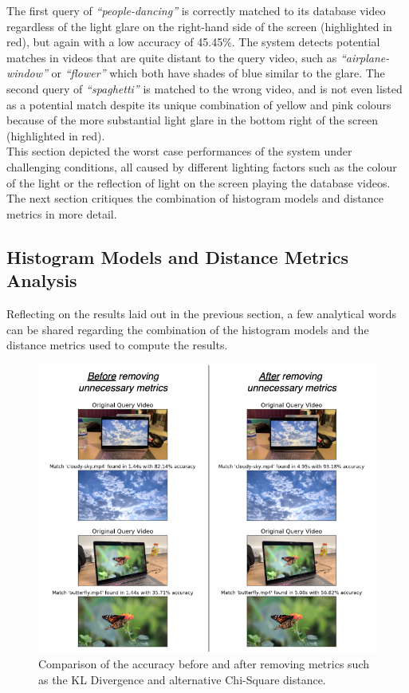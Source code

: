 The first query of \textit{``people-dancing''} is correctly matched to its database video regardless of the light glare on the right-hand side of the screen (highlighted in red), but again with a low accuracy of 45.45\%. The system detects potential matches in videos that are quite distant to the query video, such as \textit{``airplane-window''} or \textit{``flower''} which both have shades of blue similar to the glare. The second query of \textit{``spaghetti''} is matched to the wrong video, and is not even listed as a potential match despite its unique combination of yellow and pink colours because of the more substantial light glare in the bottom right of the screen (highlighted in red).\\

This section depicted the worst case performances of the system under challenging conditions, all caused by different lighting factors such as the colour of the light or the reflection of light on the screen playing the database videos. The next section critiques the combination of histogram models and distance metrics in more detail.


\clearpage
\subsection{Histogram Models and Distance Metrics Analysis}
\label{sec:evaluation-histogram-models-and-distance-metrics-analysis}

Reflecting on the results laid out in the previous section, a few analytical words can be shared regarding the combination of the histogram models and the distance metrics used to compute the results.

\begin{figure}[h] 
\centerline{\includegraphics[width=\textwidth]{figures/evaluation/comparison_before_after_removing_metrics.png}}
\caption{\label{fig:evaluation-comparison_before_after_removing_metrics}Comparison of the accuracy before and after removing metrics such as the KL Divergence and alternative Chi-Square distance.}
\end{figure}

